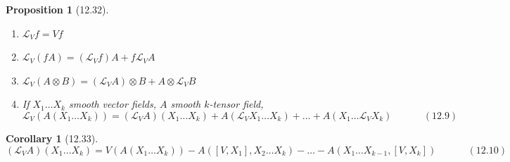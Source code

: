 \documentclass[11pt]{amsart}
\newtheorem{proposition}{Proposition}
\newtheorem{corollary}{Corollary}
\theoremstyle{definition}
\begin{document}
\hrulefill


\begin{proposition}[12.32]
  \begin{enumerate}
\item[(a)] $\mathcal{L}_V f = Vf$
\item[(b)] $\mathcal{L}_V(fA) = (\mathcal{L}_Vf )A + f\mathcal{L}_VA$
\item[(c)] $\mathcal{L}_V(A\otimes B) = (\mathcal{L}_VA) \otimes B + A \otimes \mathcal{L}_V B$
\item[(d)] If $X_1 \dots X_k$ smooth vector fields, $A$ smooth $k$-tensor field,
\begin{equation}
  \mathcal{L}_V(A(X_1 \dots X_k)) = (\mathcal{L}_VA)(X_1 \dots X_k) + A(\mathcal{L}_VX_1 \dots X_k) + \dots + A(X_1 \dots \mathcal{L}_VX_k) \quad \quad \quad \, (12.9)
\end{equation}
\end{enumerate}

\end{proposition}

\begin{corollary}[12.33]
\begin{equation}
  (\mathcal{L}_VA)(X_1 \dots X_k) = V(A(X_1 \dots X_k))  - A([V,X_1], X_2 \dots X_k) - \dots - A(X_1 \dots X_{k-1}, [V,X_k]) \quad \quad \quad \, (12.10)
\end{equation}
\end{corollary}
\end{document}
